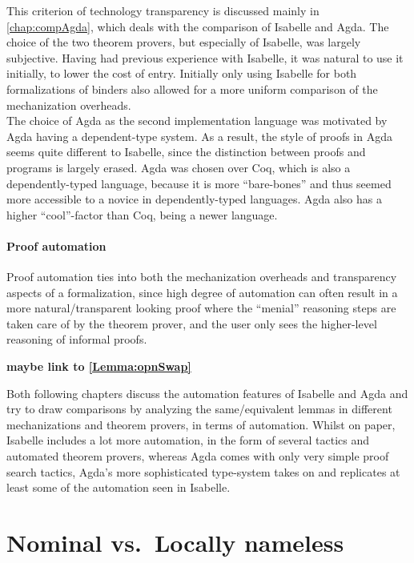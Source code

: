 \documentclass[a4paper, 12pt, twoside]{style/ociamthesis}
\theoremstyle{plain}
\theoremstyle{definition}
\theoremstyle{remark}
\begin{document}

This criterion of technology transparency is discussed mainly in
\cref{chap:compAgda}, which deals with the comparison of Isabelle and
Agda. The choice of the two theorem provers, but especially of Isabelle,
was largely subjective. Having had previous experience with Isabelle, it
was natural to use it initially, to lower the cost of entry. Initially
only using Isabelle for both formalizations of binders also allowed for
a more uniform comparison of the mechanization overheads.\\
The choice of Agda as the second implementation language was motivated
by Agda having a dependent-type system. As a result, the style of proofs
in Agda seems quite different to Isabelle, since the distinction between
proofs and programs is largely erased. Agda was chosen over Coq, which
is also a dependently-typed language, because it is more ``bare-bones''
and thus seemed more accessible to a novice in dependently-typed
languages. Agda also has a higher ``cool''-factor than Coq, being a
newer language.

\subsubsection{Proof automation}\label{proof-automation}

Proof automation ties into both the mechanization overheads and
transparency aspects of a formalization, since high degree of automation
can often result in a more natural/transparent looking proof where the
``menial'' reasoning steps are taken care of by the theorem prover, and
the user only sees the higher-level reasoning of informal proofs.

\textbf{maybe link to \cref{Lemma:opnSwap}}

Both following chapters discuss the automation features of Isabelle and
Agda and try to draw comparisons by analyzing the same/equivalent lemmas
in different mechanizations and theorem provers, in terms of automation.
Whilst on paper, Isabelle includes a lot more automation, in the form of
several tactics and automated theorem provers, whereas Agda comes with
only very simple proof search tactics, Agda's more sophisticated
type-system takes on and replicates at least some of the automation seen
in Isabelle.

\chapter{Nominal vs.~Locally nameless}\label{comp-isa}
\end{document}
